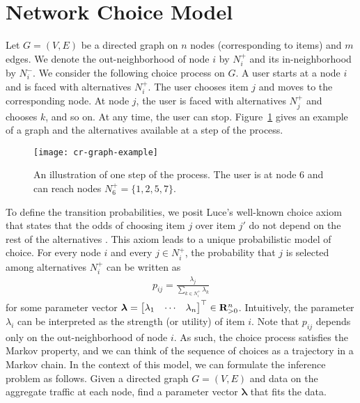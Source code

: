\section{Network Choice Model}  %
\label{cr:sec:model}

Let $G = (V,E)$ be a directed graph on $n$ nodes (corresponding to items) and $m$ edges.
We denote the out-neighborhood of node $i$ by $N^+_i$ and its in-neighborhood by $N^-_i$.
We consider the following choice process on $G$.
A user starts at a node $i$ and is faced with alternatives $N^+_i$.
The user chooses item $j$ and moves to the corresponding node.
At node $j$, the user is faced with alternatives $N^+_j$ and chooses $k$, and so on.
At any time, the user can stop.
Figure~\ref{cr:fig:samplenet} gives an example of a graph and the alternatives available at a step of the process.

\begin{figure}[t]
  \centering
  \texttt{[image: cr-graph-example]}
  \caption{An illustration of one step of the process.
  The user is at node 6 and can reach nodes $N^+_6 = \{1, 2, 5, 7\}$.}
  \label{cr:fig:samplenet}
\end{figure}

To define the transition probabilities, we posit Luce's well-known choice axiom that states that the odds of choosing item $j$ over item $j'$ do not depend on the rest of the alternatives \citep{luce1959individual}.
This axiom leads to a unique probabilistic model of choice.
For every node $i$ and every $j \in N^+_i$, the probability that $j$ is selected among alternatives $N^+_i$ can be written as
\begin{align}
\label{cr:eq:singlelik}
p_{ij} = \frac{\lambda_j}{\sum_{k \in N^+_i} \lambda_k}
\end{align}
for some parameter vector $\bm{\lambda} = \begin{bmatrix}\lambda_1 & \cdots & \lambda_n \end{bmatrix}^\top \in \mathbf{R}_{>0}^n$.
Intuitively, the parameter $\lambda_i$ can be interpreted as the strength (or utility) of item $i$.
Note that $p_{ij}$ depends only on the out-neighborhood of node $i$.
As such, the choice process satisfies the Markov property, and we can think of the sequence of choices as a trajectory in a Markov chain.
In the context of this model, we can formulate the inference problem as follows.
Given a directed graph $G = (V, E)$ and data on the aggregate traffic at each node, find a parameter vector $\bm{\lambda}$ that fits the data.
